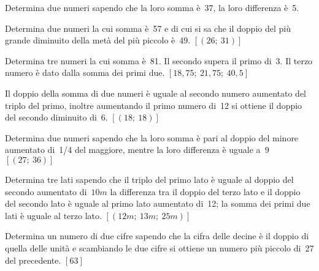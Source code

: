 \newpage
\begin{multicols}{2}
\begin{esercizio}
 \label{ese:22.77}
Determina due numeri sapendo che la loro somma è~37, la loro
differenza è~5.
\end{esercizio}

\begin{esercizio}[]
 \label{ese:22.81}
Determina due numeri la cui somma è~57 e di cui si sa che il doppio del più 
grande diminuito della metà del più piccolo è~49.
\hfill $\left[(26;~31)\right]$
\end{esercizio}

\begin{esercizio}[\Ast]
 \label{ese:22.79}
Determina tre numeri la cui somma è~81. Il secondo supera il primo
di~3. Il terzo numero è dato dalla somma dei primi due. 
\hfill $\left[18,75;~21,75;~40,5\right]$
\end{esercizio}

\begin{esercizio}[\Ast]
 \label{ese:22.78}
Il doppio della somma di due numeri è uguale al secondo numero aumentato
del triplo del primo, inoltre aumentando il primo numero di~12 si
ottiene il doppio del secondo diminuito di~6. 
\hfill $\left[(18;~18)\right]$
\end{esercizio}

\begin{esercizio}[\Ast]
 \label{ese:22.80}
Determina due numeri sapendo che la loro somma è pari al doppio del minore 
aumentato di~1/4
del maggiore, mentre la loro differenza è uguale a~$9$
\hfill $\left[(27;~36)\right]$
\end{esercizio}

\begin{esercizio}[\Ast]
 \label{ese:22.82}
Determina tre lati sapendo che il triplo del primo lato è
uguale al doppio del secondo aumentato di~$10\unit{m}$ la differenza tra il
doppio del terzo lato e il doppio del secondo lato è uguale al primo
lato aumentato di~12; la somma dei primi due lati è uguale al terzo
lato.
\hfill $\left[(12\unit{m};~13\unit{m};~25\unit{m})\right]$
\end{esercizio}

\begin{esercizio}[\Ast]
 \label{ese:22.83}
Determina un numero di due cifre sapendo che la cifra delle decine
è il doppio di quella delle unità e scambiando le due cifre si
ottiene un numero più piccolo di~27 del precedente.
\hfill $\left[63\right]$
\end{esercizio}


\end{multicols}
